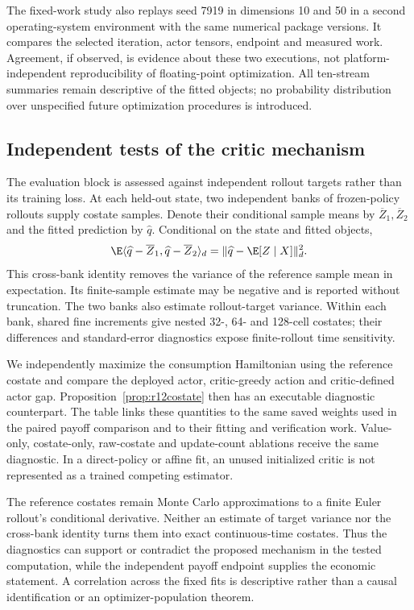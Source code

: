

The fixed-work study also replays seed 7919 in dimensions 10 and 50 in a second operating-system environment with the same numerical package versions. It compares the selected iteration, actor tensors, endpoint and measured work. Agreement, if observed, is evidence about these two executions, not platform-independent reproducibility of floating-point optimization. All ten-stream summaries remain descriptive of the fitted objects; no probability distribution over unspecified future optimization procedures is introduced.

\subsection{Independent tests of the critic mechanism}\label{sec:r13mechanism}
The evaluation block is assessed against independent rollout targets rather than its training loss. At each held-out state, two independent banks of frozen-policy rollouts supply costate samples. Denote their conditional sample means by $\overline Z_1,\overline Z_2$ and the fitted prediction by $\widehat q$. Conditional on the state and fitted objects,
\[
 \E\langle\widehat q-\overline Z_1,
                  \widehat q-\overline Z_2\rangle_d
 =\|\widehat q-\E[Z\mid X]\|_d^2.
\]
This cross-bank identity removes the variance of the reference sample mean in expectation. Its finite-sample estimate may be negative and is reported without truncation. The two banks also estimate rollout-target variance. Within each bank, shared fine increments give nested 32-, 64- and 128-cell costates; their differences and standard-error diagnostics expose finite-rollout time sensitivity.

We independently maximize the consumption Hamiltonian using the reference costate and compare the deployed actor, critic-greedy action and critic-defined actor gap. Proposition~\ref{prop:r12costate} then has an executable diagnostic counterpart. The table links these quantities to the same saved weights used in the paired payoff comparison and to their fitting and verification work. Value-only, costate-only, raw-costate and update-count ablations receive the same diagnostic. In a direct-policy or affine fit, an unused initialized critic is not represented as a trained competing estimator.

The reference costates remain Monte Carlo approximations to a finite Euler rollout's conditional derivative. Neither an estimate of target variance nor the cross-bank identity turns them into exact continuous-time costates. Thus the diagnostics can support or contradict the proposed mechanism in the tested computation, while the independent payoff endpoint supplies the economic statement. A correlation across the fixed fits is descriptive rather than a causal identification or an optimizer-population theorem.

